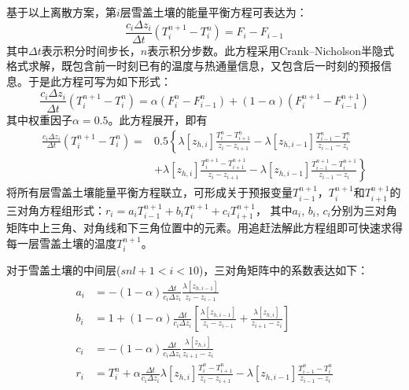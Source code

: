 基于以上离散方案，第$i$层雪盖土壤的能量平衡方程可表达为：
\begin{equation}
\frac{c_{i} \Delta z_{i}}{\Delta t}\left(T_{i}^{n+1}-T_{i}^{n}\right)=F_{i}-F_{i-1}
\end{equation}
%
其中$\Delta t$表示积分时间步长，$n$表示积分步数。此方程采用Crank--Nicholson半隐式格式求解，既包含前一时刻已有的温度与热通量信息，又包含后一时刻的预报信息。于是此方程可写为如下形式：
\begin{equation}
\frac{c_{i} \Delta z_{i}}{\Delta t}\left(T_{i}^{n+1}-T_{i}^{n}\right)=\alpha\left(F_{i}^{n}-F_{i-1}^{n}\right)+(1-\alpha)\left(F_{i}^{n+1}-F_{i-1}^{n+1}\right)
\end{equation}
其中权重因子$\alpha=0.5$。此方程展开，即有
\begin{equation}
\begin{aligned} 
\frac{c_{i} \Delta z_{i}}{\Delta t}\left(T_{i}^{n+1}-T_{i}^{n}\right)=& 0.5\left\{\lambda\left[z_{h, i}\right] \frac{T_{i}^{n}-T_{i+1}^{n}}{z_{i}-z_{i+1}}-\lambda\left[z_{h, i-1}\right] \frac{T_{i-1}^{n}-T_{i}^{n}}{z_{i-1}-z_{i}}\right.\\[1ex] &\left.+\lambda\left[z_{h, i}\right] \frac{T_{i}^{n+1}-T_{i+1}^{n+1}}{z_{i}-z_{i+1}}-\lambda\left[z_{h, i-1}\right] \frac{T_{i-1}^{n+1}-T_{i}^{n+1}}{z_{i-1}-z_{i}}\right\} 
\end{aligned}
\end{equation}
将所有层雪盖土壤能量平衡方程联立，可形成关于预报变量$T_{i-1}^{n+1}$，$T_i^{n+1}$和$T_{i+1}^{n+1}$的三对角方程组形式：$r_i=a_iT_{i-1}^{n+1}+b_iT_i^{n+1}+c_iT_{i+1}^{n+1}$，
其中$a_i$, $b_i$, $c_i$分别为三对角矩阵中上三角、对角线和下三角位置中的元素。用追赶法解此方程组即可快速求得每一层雪盖土壤的温度$T_i^{n+1}$。


对于雪盖土壤的中间层($snl+1<i<10$)，三对角矩阵中的系数表达如下：
\begin{equation}
\begin{aligned}
a_{i} &= -(1-\alpha) \frac{\Delta t}{c_{i} \Delta z_{i}} \frac{\lambda\left[z_{h, i-1}\right]}{z_{i}-z_{i-1}} \\[1ex] 
b_{i} &= 1+(1-\alpha) \frac{\Delta t}{c_{i} \Delta z_{i}}\left[\frac{\lambda\left[z_{h, i-1}\right]}{z_{i}-z_{i-1}}+\frac{\lambda\left[z_{h, i}\right]}{z_{i+1}-z_{i}}\right] \\[1ex] 
c_{i} &= -(1-\alpha) \frac{\Delta t}{c_{i} \Delta z_{i}} \frac{\lambda\left[z_{h, i}\right]}{z_{i+1}-z_{i}} \\[1ex]
r_{i} &= T_{i}^{n}+\alpha \frac{\Delta t}{c_{i} \Delta z_{i}} \lambda\left[z_{h, i}\right] \frac{T_{i}^{n}-T_{i+1}^{n}}{z_{i}-z_{i+1}}-\lambda\left[z_{h, i-1}\right] \frac{T_{i-1}^{n}-T_{i}^{n}}{z_{i-1}-z_{i}}
\end{aligned}
\end{equation}

